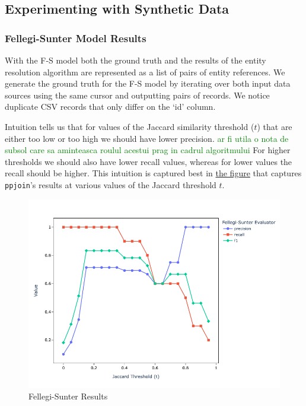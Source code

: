 \documentclass[11pt]{article}
\begin{document}
    \subsection{Experimenting with Synthetic Data}

    \subsubsection{Fellegi-Sunter Model Results}
    
    With the F-S model both the ground truth and the results of the entity
    resolution algorithm are represented as a list of pairs of entity
    references.
    We generate the ground truth for the F-S model by iterating over both
    input data sources using the same cursor and outputting pairs of records.
    We notice duplicate CSV records that only differ on the `id' column.

    Intuition tells us that for values of the Jaccard similarity threshold ($t$)
    that are either too low or too high we should have lower precision.
    \textcolor{green}{ar fi utila o nota de subsol care sa aminteasca roulul acestui prag in cadrul algoritmului} 
    For higher thresholds we should also have lower recall values, whereas for
    lower values the recall should be higher.
    This intuition is captured best in \hyperref[fsfig]{the figure} that
    captures \texttt{ppjoin}'s results at various values of the Jaccard
    threshold $t$.

    \begin{figure}
        \centering
        \includegraphics[width=\textwidth]{mini-fs}
        \caption{Fellegi-Sunter Results}\label{fsfig}
    \end{figure}
\end{document}
